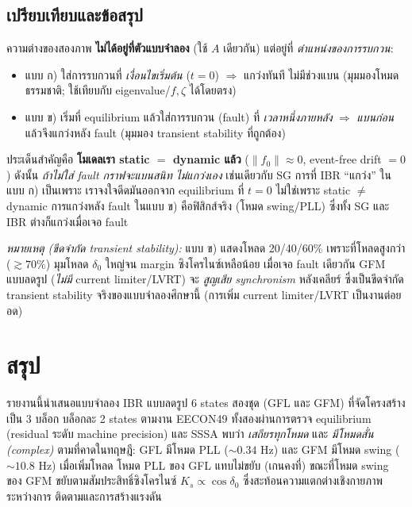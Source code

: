 \documentclass[12pt,a4paper]{article}
\begin{document}
\subsection{เปรียบเทียบและข้อสรุป}
ความต่างของสองภาพ \textbf{ไม่ได้อยู่ที่ตัวแบบจำลอง} (ใช้ $A$ เดียวกัน) แต่อยู่ที่ \emph{ตำแหน่งของการรบกวน}:
\begin{itemize}\itemsep2pt
  \item แบบ ก) ใส่การรบกวนที่ \emph{เงื่อนไขเริ่มต้น} ($t=0$) $\Rightarrow$ แกว่งทันที ไม่มีช่วงแบน
  (มุมมองโหมดธรรมชาติ; ใช้เทียบกับ eigenvalue/$f,\zeta$ ได้โดยตรง)
  \item แบบ ข) เริ่มที่ equilibrium แล้วใส่การรบกวน (fault) ที่ \emph{เวลาหนึ่งภายหลัง} $\Rightarrow$
  \emph{แบนก่อน} แล้วจึงแกว่งหลัง fault (มุมมอง transient stability ที่ถูกต้อง)
\end{itemize}
ประเด็นสำคัญคือ \textbf{โมเดลเรา static $=$ dynamic แล้ว} ($\|f_0\|\approx0$, event-free drift $=0$) ดังนั้น
\emph{ถ้าไม่ใส่ fault กราฟจะแบนสนิท ไม่แกว่งเอง} เช่นเดียวกับ SG การที่ IBR ``แกว่ง'' ในแบบ ก) เป็นเพราะ
เราจงใจดีดมันออกจาก equilibrium ที่ $t=0$ ไม่ใช่เพราะ static $\neq$ dynamic การแกว่งหลัง fault ในแบบ ข)
คือฟิสิกส์จริง (โหมด swing/PLL) ซึ่งทั้ง SG และ IBR ต่างก็แกว่งเมื่อเจอ fault

\noindent\emph{หมายเหตุ (ขีดจำกัด transient stability):} แบบ ข) แสดงโหลด 20/40/60\% เพราะที่โหลดสูงกว่า
($\gtrsim70\%$) มุมโหลด $\delta_0$ ใหญ่จน margin ซิงโครไนซ์เหลือน้อย เมื่อเจอ fault เดียวกัน GFM แบบลดรูป
(\emph{ไม่มี} current limiter/LVRT) จะ \emph{สูญเสีย synchronism} หลังเคลียร์ ซึ่งเป็นขีดจำกัด transient
stability จริงของแบบจำลองศึกษานี้ (การเพิ่ม current limiter/LVRT เป็นงานต่อยอด)

\section{สรุป}

รายงานนี้นำเสนอแบบจำลอง IBR แบบลดรูป 6 states สองชุด (GFL และ GFM) ที่จัดโครงสร้างเป็น 3 บล็อก บล็อกละ 2
states ตามงาน EECON49 ทั้งสองผ่านการตรวจ equilibrium (residual ระดับ machine precision) และ SSSA พบว่า
\emph{เสถียรทุกโหมด} และ \emph{มีโหมดสั่น (complex)} ตามที่คาดในทฤษฎี: GFL มีโหมด PLL ($\sim0.34$ Hz) และ
GFM มีโหมด swing ($\sim10.8$ Hz) เมื่อเพิ่มโหลด โหมด PLL ของ GFL แทบไม่ขยับ (เกนคงที่) ขณะที่โหมด swing
ของ GFM ขยับตามสัมประสิทธิ์ซิงโครไนซ์ $K_s\propto\cos\delta_0$ ซึ่งสะท้อนความแตกต่างเชิงกายภาพระหว่างการ
ติดตามและการสร้างแรงดัน
\end{document}
